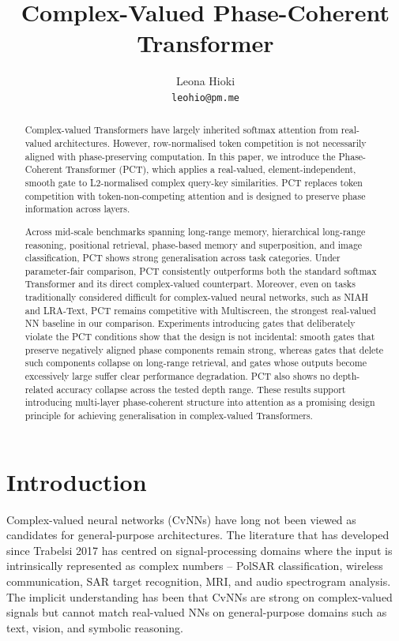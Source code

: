 \documentclass[11pt,a4paper]{article}
\title{\textbf{Complex-Valued Phase-Coherent Transformer}}
\author{Leona Hioki\\
\texttt{leohio@pm.me}}
\date{}
\theoremstyle{plain}
\theoremstyle{definition}
\begin{document}
\maketitle

\small

\begin{abstract}
\setlength{\parindent}{0pt}
\setlength{\parskip}{0.6\baselineskip}
\noindent\ignorespaces
Complex-valued Transformers have largely inherited softmax attention from real-valued architectures. However, row-normalised token competition is not necessarily aligned with phase-preserving computation. In this paper, we introduce the Phase-Coherent Transformer (PCT), which applies a real-valued, element-independent, smooth gate to L2-normalised complex query-key similarities. PCT replaces token competition with token-non-competing attention and is designed to preserve phase information across layers.

Across mid-scale benchmarks spanning long-range memory, hierarchical long-range reasoning, positional retrieval, phase-based memory and superposition, and image classification, PCT shows strong generalisation across task categories. Under parameter-fair comparison, PCT consistently outperforms both the standard softmax Transformer and its direct complex-valued counterpart. Moreover, even on tasks traditionally considered difficult for complex-valued neural networks, such as NIAH and LRA-Text, PCT remains competitive with Multiscreen, the strongest real-valued NN baseline in our comparison. Experiments introducing gates that deliberately violate the PCT conditions show that the design is not incidental: smooth gates that preserve negatively aligned phase components remain strong, whereas gates that delete such components collapse on long-range retrieval, and gates whose outputs become excessively large suffer clear performance degradation. PCT also shows no depth-related accuracy collapse across the tested depth range. These results support introducing multi-layer phase-coherent structure into attention as a promising design principle for achieving generalisation in complex-valued Transformers.

\end{abstract}

\medskip

\section{Introduction}
Complex-valued neural networks (CvNNs) have long not been viewed as candidates for general-purpose architectures. The literature that has developed since Trabelsi 2017 has centred on signal-processing domains where the input is intrinsically represented as complex numbers -- PolSAR classification, wireless communication, SAR target recognition, MRI, and audio spectrogram analysis. The implicit understanding has been that CvNNs are strong on complex-valued signals but cannot match real-valued NNs on general-purpose domains such as text, vision, and symbolic reasoning.
\end{document}
